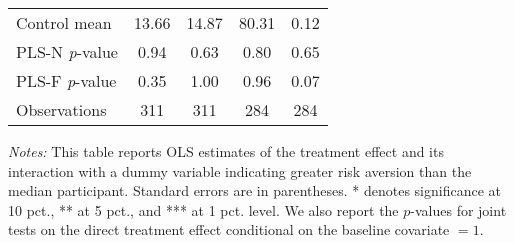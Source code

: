 \begin{table}[ht]
{\begin{threeparttable}
\begin{tabular}{l*{4}{c}}
Control mean    &    13.66         &    14.87         &    80.31         &     0.12         \\
PLS-N \emph{p}-value&     0.94         &     0.63         &     0.80         &     0.65         \\
PLS-F \emph{p}-value&     0.35         &     1.00         &     0.96         &     0.07         \\
Observations    &      311         &      311         &      284         &      284         \\
\bottomrule \end{tabular} \begin{tablenotes}[flushleft] \footnotesize \item \emph{Notes:} This table reports OLS estimates of the treatment effect and its interaction with a dummy variable indicating greater risk aversion than the median participant. Standard errors are in parentheses. * denotes significance at 10 pct., ** at 5 pct., and *** at 1 pct. level. We also report the \(p\)-values for joint tests on the direct treatment effect conditional on the baseline covariate $= 1$. \end{tablenotes} \end{threeparttable} } \end{table}

